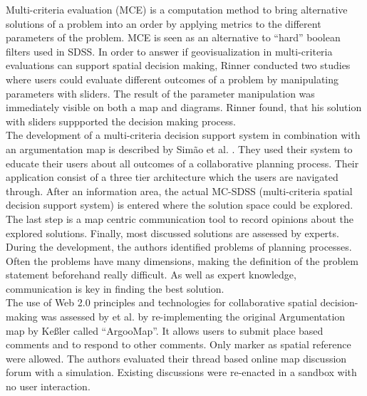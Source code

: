 Multi-criteria evaluation (MCE) is a computation method to bring alternative solutions of a problem into an order by applying metrics to the different parameters of the problem. MCE is seen as an alternative to ``hard'' boolean filters used in SDSS. In order to answer if geovisualization in multi-criteria evaluations can support spatial decision making, Rinner \cite{Rinner2007_geovis_decisionsupport} conducted two studies where users could evaluate different outcomes of a problem by manipulating parameters with sliders. The result of the parameter manipulation was immediately visible on both a map and diagrams. Rinner found, that his solution with sliders suppported the decision making process.\\
The development of a multi-criteria decision support system in combination with an argumentation map is described by Sim\~{a}o et al. \cite{Simao2009Webbased}. They used their system to educate their users about all outcomes of a collaborative planning process. Their application consist of a three tier architecture which the users are navigated through. After an information area, the actual MC-SDSS (multi-criteria spatial decision support system) is entered where the solution space could be explored. The last step is a map centric communication tool to record opinions about the explored solutions. Finally, most discussed solutions are assessed by experts. During the development, the authors identified problems of planning processes. Often the problems have many dimensions, making the definition of the problem statement beforehand really difficult. As well as expert knowledge, communication is key in finding the best solution.\\
The use of Web 2.0 principles and technologies for collaborative spatial decision-making was assessed by \cite{Rinner2009_Web2_argumap} et al. by re-implementing the original Argumentation map by Ke{\ss}ler \cite{Kessler2005_ArgumentationMapPrototype} called ``ArgooMap''. It allows users to submit place based comments and to respond to other comments. Only marker as spatial reference were allowed. The authors evaluated their thread based online map discussion forum with a simulation. Existing discussions were re-enacted in a sandbox with no user interaction.\\

